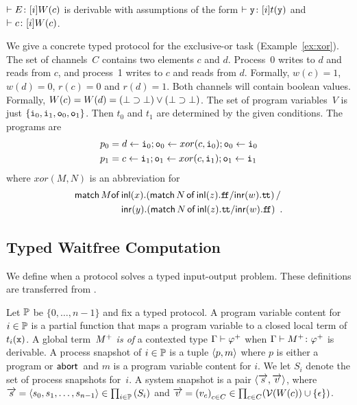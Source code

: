 {\begin{itemize}
       $\vdash{E} \colon{[i]W(c)}$ is derivable with
       assumptions of the form $\vdash{\texttt{y}} \colon{[i]t(\texttt{y})}$ and
       $\vdash{c} \colon{[i]W(c)}$.
\end{itemize}
 \begin{example}
  \label{ex:xor-protocol}
  We give a concrete typed protocol for the exclusive-or task
  (Example~\ref{ex:xor}).
  The set of channels~$C$ contains two elements $c$ and $d$.
  Process~0 writes to $d$ and reads from $c$, and process~1
  writes to $c$ and reads from $d$.
  Formally, $w(c) = 1$, $w(d) = 0$, $r(c) = 0$ and $r(d) = 1$.
  Both channels will contain boolean values.
  Formally, $W(c) = W(d) = (\bot\supset\bot)\lor(\bot\supset\bot)$.
  The set of program variables~$V$ is just $\{\texttt{i}_0, \texttt{i}_1, \texttt{o}_0, \texttt{o}_1\}$.
  Then $t_0$ and $t_1$ are determined by the given conditions.
  The programs are
  \begin{align*}
   p_0 &= d\leftarrow \texttt{i}_0; \texttt{o}_0\leftarrow xor(c, \texttt{i}_0); \texttt{o}_0
   \leftarrow \texttt{i}_0 \\
   p_1 &= c\leftarrow \texttt{i}_1; \texttt{o}_1\leftarrow xor(c, \texttt{i}_1); \texttt{o}_1
   \leftarrow \texttt{i}_1
  \end{align*}
  where $xor(M,N)$ is an abbreviation for
  \begin{align*}
  \mathsf{match\,}{M}\mathsf{of}\,&\mathsf{inl}({x}).{
  (\mathsf{match}\,{N}\,\mathsf{of}\, \mathsf{inl}({z}). {\texttt{f\kern -1.7pt f}}/ \mathsf{inr}({w}). {\texttt{t\kern -1.2pt t}})
  }\,/\\ &\mathsf{inr}({y}).{
  (\mathsf{match}\,{N}\,\mathsf{of}\, \mathsf{inl}({z}). {\texttt{t\kern -1.2pt t}}/ \mathsf{inr}({w}). {\texttt{f\kern -1.7pt f}})
  }\enspace.
  \end{align*}
 \end{example}

\subsection{Typed Waitfree Computation}

We define when a protocol solves a typed
input-output problem.
These definitions are transferred from \citet{Saks:1993vq}.

Let $\mathbb{P}$ be $\{0,\ldots, n-1\}$ and fix a typed protocol.
A program variable content for $i\in\mathbb{P}$ is a
partial function that maps a program variable to a closed local term of
$t_i(\texttt{x})$.
A global term~${M}^+$ \textit{is of} a contexted type $\Gamma\vdash{\varphi}^+$ when
$\Gamma\vdash{{M}^+} \colon{{\varphi}^+}$ is derivable.
A process snapshot of $i\in\mathbb{P}$ is a tuple
$\langle{p,m}\rangle$ where $p$ is either a program or $\mathsf{abort\,}$ and $m$ is a
program variable content for $i$.
We let $S_i$ denote the set of process snapshots for~$i$.
A system snapshot
is a pair $\langle{\overrightarrow s, \overrightarrow v}\rangle$, where $\overrightarrow s = \langle{s_0,
{s_1,{\ldots,s_{n-1}}}}\rangle \in
\prod_{i\in \mathbb{P}}\left(S_i\right)
$
and
$\overrightarrow v =
\left(v_c\right)_{c\in C} \in \prod_{c\in C}(\mathcal{V}(W(c))\cup\{\epsilon\})
$.

}
